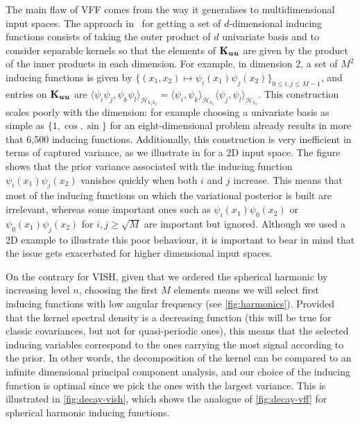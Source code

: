 The main flaw of VFF comes from the way it generalises to multidimensional input spaces. The approach in~\citet{hensman2017variational} for getting a set of $d$-dimensional inducing functions consists of taking the outer product of $d$ univariate basis and to consider separable kernels so that the elements of $\mathbf{{K}}_{\bm{u} \bm{u}}$ are given by the product of the inner products in each dimension. For example, in dimension 2, a set of $M^2$ inducing functions is given by $\{(x_1, x_2) \mapsto \psi_i(x_1)\psi_j(x_2)\}_{0 \leq i, j \leq M-1}$, and entries on $\mathbf{{K}}_{\bm{u} \bm{u}}$ are $\langle \psi_i\psi_j, \psi_k\psi_l \rangle_{\mathcal{H}_{k_1 k_2}^{}}^{} = \langle \psi_i, \psi_k \rangle_{\mathcal{H}_{k_1}^{}}^{} \langle \psi_j, \psi_l \rangle_{\mathcal{H}_{k_2}^{}}^{}$. This construction scales poorly with the dimension: for example choosing a univariate basis as simple as $\{1, \cos, \sin\}$ for an eight-dimensional problem already results in more that 6,500 inducing functions. Additionally, this construction is very inefficient in terms of captured variance, as we illustrate in   for a 2D input space. The figure shows that the prior variance associated with the inducing function $\psi_i(x_1)\psi_j(x_2)$ vanishes quickly when both $i$ and $j$ increase. This means that most of the inducing functions on which the variational posterior is built are irrelevant, whereas some important ones such as $\psi_i(x_1)\psi_0(x_2)$ or $\psi_0(x_1)\psi_j(x_2)$ for $i, j \geq \sqrt{M}$ are important but ignored. Although we used a 2D example to illustrate this poor behaviour, it is important to bear in mind that the issue gets exacerbated for higher dimensional input spaces.

On the contrary for VISH, given that we ordered the spherical harmonic by increasing level $n$, choosing the first $M$ elements means we will select first inducing functions with low angular frequency (see \cref{fig:harmonics}). Provided that the kernel spectral density is a decreasing function (this will be true for classic covariances, but not for quasi-periodic ones), this means that the selected inducing variables correspond to the ones carrying the most signal according to the prior. In other words, the decomposition of the kernel can be compared to an infinite dimensional principal component analysis, and our choice of the inducing function is optimal since we pick the ones with the largest variance. This is illustrated in \cref{fig:decay-vish}, which shows the analogue of \cref{fig:decay-vff} for spherical harmonic inducing functions.


